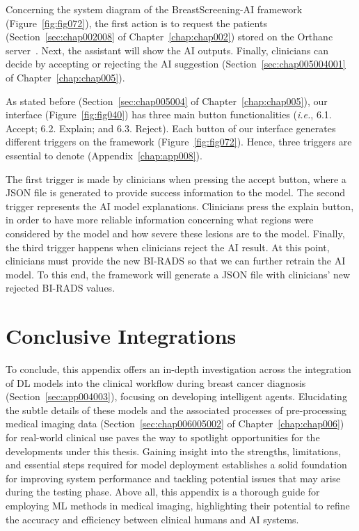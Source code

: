 Concerning the system diagram of the BreastScreening-AI framework (Figure~\ref{fig:fig072}), the first action is to request the patients (Section~\ref{sec:chap002008} of Chapter~\ref{chap:chap002}) stored on the Orthanc server~\cite{Jodogne2018}.
Next, the assistant will show the \ac{AI} outputs.
Finally, clinicians can decide by accepting or rejecting the \ac{AI} suggestion (Section~\ref{sec:chap005004001} of Chapter~\ref{chap:chap005}).

As stated before (Section~\ref{sec:chap005004} of Chapter~\ref{chap:chap005}), our interface (Figure~\ref{fig:fig040}) has three main button functionalities ({\it i.e.}, 6.1. Accept; 6.2. Explain; and 6.3. Reject).
Each button of our interface generates different triggers on the framework (Figure~\ref{fig:fig072}).
Hence, three triggers are essential to denote (Appendix~\ref{chap:app008}).



The first trigger is made by clinicians when pressing the accept button, where a \ac{JSON} file is generated to provide success information to the model.
The second trigger represents the \ac{AI} model explanations.
Clinicians press the explain button, in order to have more reliable information concerning what regions were considered by the model and how severe these lesions are to the model.
Finally, the third trigger happens when clinicians reject the \ac{AI} result.
At this point, clinicians must provide the new \ac{BI-RADS} so that we can further retrain the \ac{AI} model.
To this end, the framework will generate a \ac{JSON} file with clinicians' new rejected \ac{BI-RADS} values.

\section{Conclusive Integrations}
\label{sec:app004010}

To conclude, this appendix offers an in-depth investigation across the integration of \ac{DL} models into the clinical workflow during breast cancer diagnosis (Section~\ref{sec:app004003}), focusing on developing intelligent agents.
Elucidating the subtle details of these models and the associated processes of pre-processing medical imaging data (Section~\ref{sec:chap006005002} of Chapter~\ref{chap:chap006}) for real-world clinical use paves the way to spotlight opportunities for the developments under this thesis.
Gaining insight into the strengths, limitations, and essential steps required for model deployment establishes a solid foundation for improving system performance and tackling potential issues that may arise during the testing phase.
Above all, this appendix is a thorough guide for employing \ac{ML} methods in medical imaging, highlighting their potential to refine the accuracy and efficiency between clinical humans and \ac{AI} systems.